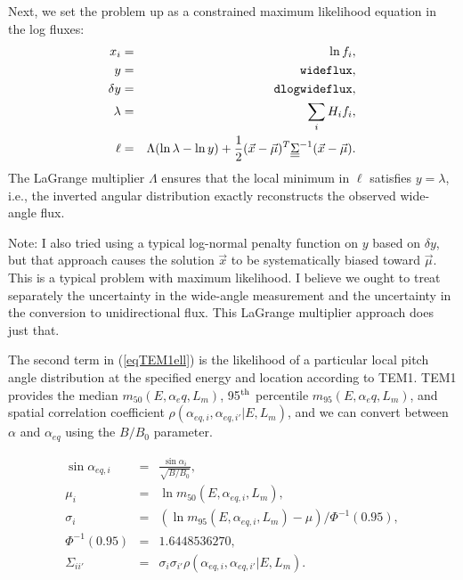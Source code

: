 \documentclass{article}    %
\newcommand{\dbul}[1]{\underline{\underline{#1}}}
\begin{document}
Next, we set the problem up as a constrained maximum likelihood equation in the log fluxes:
\begin{eqnarray}
x_i &=& \ln f_i, \\
y &=& \verb|wideflux|, \\
\delta y &=& \verb|dlogwideflux|, \\
\lambda &=& \sum_i H_i f_i, \\
\ell &=& \Lambda(\ln\lambda-\ln y) + \frac{1}{2}(\vec{x}-\vec{\mu})^T \dbul{\Sigma}^{-1} (\vec{x}-\vec{\mu}). \label{eqTEM1ell}
\end{eqnarray}
The LaGrange multiplier $\Lambda$ ensures that the local minimum in
$\ell$ satisfies $y=\lambda$, i.e., the inverted angular distribution
exactly reconstructs the observed wide-angle flux. 

Note: I also tried using a typical log-normal penalty function on $y$
based on $\delta y$, but that approach causes the solution $\vec{x}$
to be systematically biased toward $\vec{\mu}$. This is a typical
problem with maximum likelihood. I believe we ought to treat
separately the uncertainty in the wide-angle measurement and the
uncertainty in the conversion to unidirectional flux. This LaGrange
multiplier approach does just that.

The second term in (\ref{eqTEM1ell}) is the likelihood of a particular
local pitch angle distribution at the specified energy and location
according to TEM1. TEM1 provides the median $m_{50}(E,\alpha_eq,L_m)$,
95$^{\rm th}$ percentile $m_{95}(E,\alpha_eq,L_m)$, and spatial
correlation coefficient $\rho(\alpha_{eq,i},\alpha_{eq,i'}|E,L_m)$,
and we can convert between $\alpha$ and $\alpha_{eq}$ using the
$B/B_0$ parameter.

\begin{eqnarray}
\sin\alpha_{eq,i} &=& \frac{\sin\alpha_i}{\sqrt{B/B_0}}, \\
\mu_i &=& \ln m_{50}(E,\alpha_{eq,i},L_m), \\
\sigma_i &=& (\ln m_{95}(E,\alpha_{eq,i},L_m)-\mu)/\Phi^{-1}(0.95), \\
\Phi^{-1}(0.95) &=& 1.6448536270, \\
\Sigma_{ii'} &=& \sigma_i \sigma_{i'} \rho(\alpha_{eq,i},\alpha_{eq,i'}|E,L_m).
\end{eqnarray}
\end{document}
